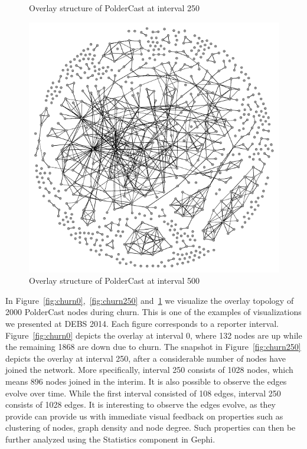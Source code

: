 \begin{figure}[H]
    \caption{Overlay structure  of PolderCast at interval 250}
    \label{fig:churn250}
    \includegraphics[scale=1]{figures/churn_500}
    \caption{Overlay structure of PolderCast at interval 500}
    \label{fig:churn500}
\end{figure}

In Figure~\ref{fig:churn0},~\ref{fig:churn250} and~\ref{fig:churn500} we
visualize the overlay topology of 2000 PolderCast nodes during churn.
This is one of the examples of visualizations we presented at DEBS 2014.
Each figure corresponds to a reporter interval. Figure~\ref{fig:churn0}
depicts the overlay at interval 0, where 132 nodes are up while the
remaining 1868 are down due to churn. The snapshot in
Figure~\ref{fig:churn250} depicts the overlay at interval 250, after a
considerable number of nodes have joined the network. More specifically,
interval 250 consists of 1028 nodes, which means 896 nodes joined in the
interim. It is also possible to observe the edges evolve over time. While the first interval consisted
of 108 edges, interval 250 consists of 1028 edges. It is interesting to
observe the edges evolve, as they provide can provide us with
immediate visual feedback on properties such as clustering of nodes,
graph density and node degree. Such properties can then be further
analyzed using the Statistics component in Gephi.

